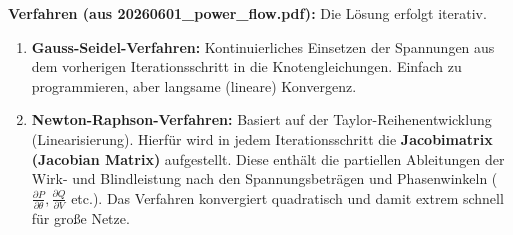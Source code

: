 \documentclass[11pt, a4paper]{article}
\begin{document}
\textbf{Verfahren (aus 20260601\_power\_flow.pdf):}
Die Lösung erfolgt iterativ.
\begin{enumerate}
    \item \textbf{Gauss-Seidel-Verfahren:} Kontinuierliches Einsetzen der Spannungen aus dem vorherigen Iterationsschritt in die Knotengleichungen. Einfach zu programmieren, aber langsame (lineare) Konvergenz.
    \item \textbf{Newton-Raphson-Verfahren:} Basiert auf der Taylor-Reihenentwicklung (Linearisierung). Hierfür wird in jedem Iterationsschritt die \textbf{Jacobimatrix (Jacobian Matrix)} aufgestellt. Diese enthält die partiellen Ableitungen der Wirk- und Blindleistung nach den Spannungsbeträgen und Phasenwinkeln ($\frac{\partial P}{\partial \theta}, \frac{\partial Q}{\partial V}$ etc.). Das Verfahren konvergiert quadratisch und damit extrem schnell für große Netze.
\end{enumerate}
\end{document}
